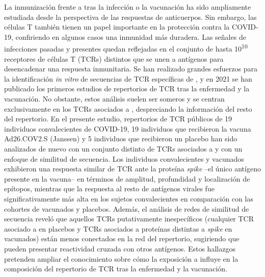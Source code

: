 La inmunización frente a \covid{} tras la infección o la vacunación ha sido ampliamente estudiada desde la perspectiva de las respuestas de anticuerpos. Sin embargo, las células T también tienen un papel importante en la protección contra la COVID-19, confiriendo en algunos casos una inmunidad más duradera. Las señales de infecciones pasadas y presentes quedan reflejadas en el conjunto de hasta 10\textsuperscript{10} receptores de células T (TCRs) distintos que se unen a antígenos para desencadenar una respuesta inmunitaria. Se han realizado grandes esfuerzos para la identificación \textit{in vitro} de secuencias de TCR específicas de \covid{}, y en 2021 se han publicado los primeros estudios de repertorios de TCR tras la enfermedad y la vacunación. No obstante, estos análisis suelen ser someros y se centran exclusivamente en los TCRs asociados a \covid{}, despreciando la información del resto del repertorio. En el presente estudio, repertorios de TCR públicos de 19 individuos convalecientes de COVID-19, 19 individuos que recibieron la vacuna Ad26.COV2.S (Janssen) y 5 individuos que recibieron un placebo han sido analizados de nuevo con un conjunto distinto de TCRs asociados a \covid{} y con un enfoque de similitud de secuencia. Los individuos convalecientes y vacunados exhibieron una respuesta similar de TCR ante la proteína \textit{spike} --el único antígeno presente en la vacuna-- en términos de amplitud, profundidad y localización de epítopos, mientras que la respuesta al resto de antígenos virales fue significativamente más alta en los sujetos convalecientes en comparación con las cohortes de vacunados y placebos. Además, el análisis de redes de similitud de secuencia reveló que aquellos TCRs putativamente inespecíficos (cualquier TCR asociado a \covid{} en placebos y TCRs asociados a proteínas distintas a \textit{spike} en vacunados) están menos conectados en la red del repertorio, sugiriendo que pueden presentar reactividad cruzada con otros antígenos. Estos hallazgos pretenden ampliar el conocimiento sobre cómo la exposición a \covid{} influye en la composición del repertorio de TCR tras la enfermedad y la vacunación.






\newpage

